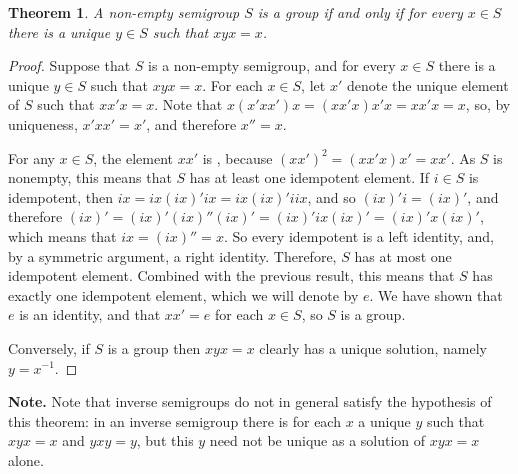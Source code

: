 \documentclass[12pt]{article}
\newtheorem*{thm*}{Theorem}
\begin{document}

\begin{thm*}
A non-empty semigroup $S$ is a group
if and only if
for every $x\in S$ there is a unique $y\in S$ such that $xyx=x$.
\end{thm*}

\begin{proof}
Suppose that $S$ is a non-empty semigroup,
and for every $x\in S$ there is a unique $y\in S$ such that $xyx=x$.
For each $x\in S$,
let $x'$ denote the unique element of $S$ such that $xx'x=x$.
Note that $x(x'xx')x=(xx'x)x'x=xx'x=x$,
so, by uniqueness, $x'xx'=x'$,
and therefore $x''=x$.

For any $x\in S$, the element $xx'$ is ,
because $(xx')^2=(xx'x)x'=xx'$.
As $S$ is nonempty, this means that $S$ has at least one idempotent element.
If $i\in S$ is idempotent,
then $ix=ix(ix)'ix=ix(ix)'iix$, and so $(ix)'i=(ix)'$,
and therefore $(ix)'=(ix)'(ix)''(ix)'=(ix)'ix(ix)'=(ix)'x(ix)'$,
which means that $ix=(ix)''=x$.
So every idempotent is a left identity,
and, by a symmetric argument, a right identity.
Therefore, $S$ has at most one idempotent element.
Combined with the previous result,
this means that $S$ has exactly one idempotent element,
which we will denote by $e$.
We have shown that $e$ is an identity,
and that $xx'=e$ for each $x\in S$, so $S$ is a group.

Conversely, if $S$ is a group
then $xyx=x$ clearly has a unique solution, namely $y=x^{-1}$.
\end{proof}

{\bf Note.} Note that inverse semigroups do not in general
satisfy the hypothesis of this theorem:
in an inverse semigroup there is for each $x$ a unique $y$ such that $xyx=x$ and $yxy=y$,
but this $y$ need not be unique as a solution of $xyx=x$ alone.
\end{document}
